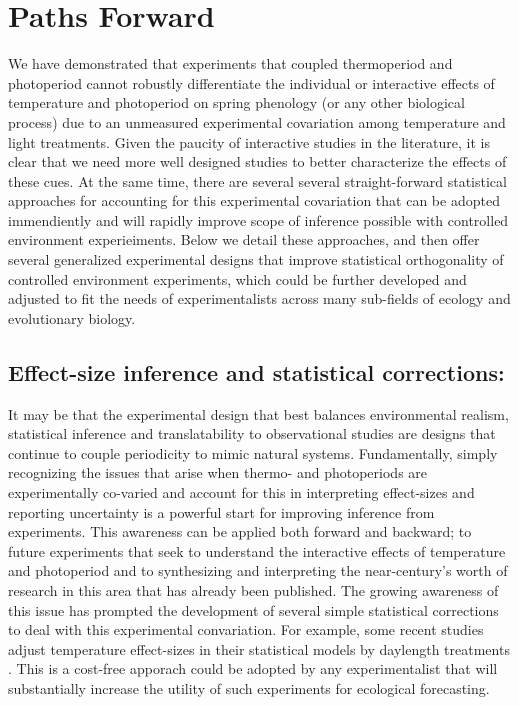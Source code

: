 \documentclass[11pt]{article}
\begin{document}
\section*{Paths Forward}
We have demonstrated that experiments that coupled thermoperiod and photoperiod cannot robustly differentiate the individual or interactive effects of temperature and photoperiod on spring phenology (or any other biological process) due to an unmeasured experimental covariation among temperature and light treatments. Given the paucity of interactive studies in the literature, it is clear that we need more well designed studies to better characterize the effects of these cues. At the same time, there are several several straight-forward statistical approaches for accounting for this experimental covariation that can be adopted immendiently and will rapidly improve scope  of inference possible with controlled environment experieiments. Below we detail these approaches, and then offer several generalized experimental designs that improve statistical orthogonality of controlled environment experiments, which could be further developed and adjusted to fit the needs of experimentalists across many sub-fields of ecology and evolutionary biology. 

\subsection*{Effect-size inference and statistical corrections:}
It may be that the experimental design that best balances environmental realism, statistical inference and translatability to observational studies are designs that continue to couple periodicity to mimic natural systems. Fundamentally, simply recognizing the issues that arise when thermo- and photoperiods are experimentally co-varied and account for this in interpreting effect-sizes and reporting uncertainty is a powerful start  for improving inference from experiments. This awareness can be applied both forward and backward; to future experiments that seek to understand the interactive effects of temperature and photoperiod and to synthesizing and interpreting the near-century's worth of research in this area that has already been published. The growing awareness of this issue has prompted the development of several simple statistical corrections to deal with this experimental convariation. For example, some recent studies adjust temperature effect-sizes in their statistical models by daylength treatments \citep[e.g.,][]{}. This is a cost-free apporach could be adopted by any experimentalist that will substantially increase the utility of such experiments for ecological forecasting.
\end{document}
